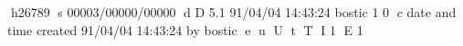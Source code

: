 h26789
s 00003/00000/00000
d D 5.1 91/04/04 14:43:24 bostic 1 0
c date and time created 91/04/04 14:43:24 by bostic
e
u
U
t
T
I 1
E 1
